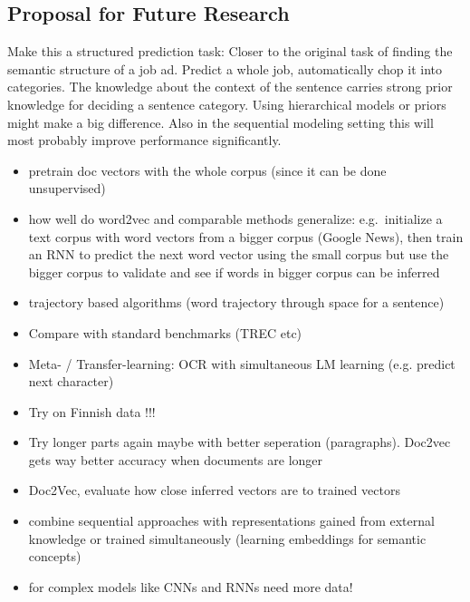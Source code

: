%

\subsection*{Proposal for Future Research}
\label{sub:further-research}

Make this a structured prediction task: Closer to the original task of finding the semantic structure of a job ad. Predict a whole job, automatically chop it into categories. The knowledge about the context of the sentence carries strong prior knowledge for deciding a sentence category. Using hierarchical models or priors might make a big difference. Also in the sequential modeling setting this will most probably improve performance significantly.

\begin{itemize}
	\item pretrain doc vectors with the whole corpus (since it can be done unsupervised)
  \item how well do word2vec and comparable methods generalize: e.g.\ initialize a text corpus with word vectors from a bigger corpus (Google News), then train an RNN to predict the next word vector using the small corpus but use the bigger corpus to validate and see if words in bigger corpus can be inferred
  \item trajectory based algorithms (word trajectory through space for a sentence)
  \item Compare with standard benchmarks (TREC etc)
  \item Meta- / Transfer-learning: OCR with simultaneous LM learning (e.g. predict next character)
  \item Try on Finnish data !!!
  \item Try longer parts again maybe with better seperation (paragraphs). Doc2vec gets way better accuracy when documents are longer
  \item Doc2Vec, evaluate how close inferred vectors are to trained vectors
  \item combine sequential approaches with representations gained from external knowledge or trained simultaneously (learning embeddings for semantic concepts)
  \item for complex models like CNNs and RNNs need more data!
  \
\end{itemize}


